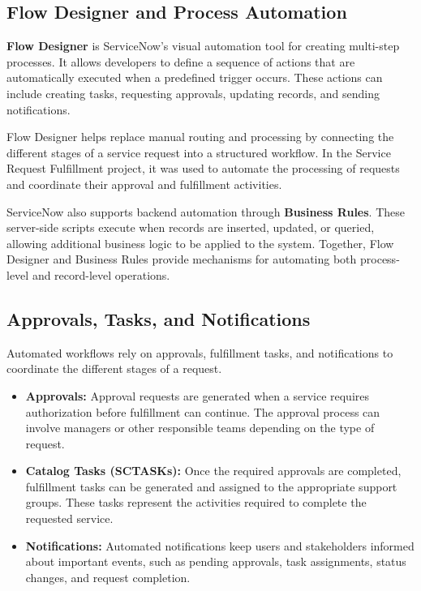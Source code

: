 \documentclass[12pt,a4paper]{report}
\begin{document}
\subsection{Flow Designer and Process Automation}

\textbf{Flow Designer} is ServiceNow's visual automation tool for creating
multi-step processes. It allows developers to define a sequence of actions
that are automatically executed when a predefined trigger occurs. These
actions can include creating tasks, requesting approvals, updating records,
and sending notifications.

Flow Designer helps replace manual routing and processing by connecting the
different stages of a service request into a structured workflow. In the
Service Request Fulfillment project, it was used to automate the processing
of requests and coordinate their approval and fulfillment activities.

ServiceNow also supports backend automation through \textbf{Business Rules}.
These server-side scripts execute when records are inserted, updated, or
queried, allowing additional business logic to be applied to the system.
Together, Flow Designer and Business Rules provide mechanisms for automating
both process-level and record-level operations.

\subsection{Approvals, Tasks, and Notifications}

Automated workflows rely on approvals, fulfillment tasks, and notifications
to coordinate the different stages of a request.

\begin{itemize}
    \item \textbf{Approvals:} Approval requests are generated when a service
    requires authorization before fulfillment can continue. The approval
    process can involve managers or other responsible teams depending on the
    type of request.

    \item \textbf{Catalog Tasks (SCTASKs):} Once the required approvals are
    completed, fulfillment tasks can be generated and assigned to the
    appropriate support groups. These tasks represent the activities required
    to complete the requested service.

    \item \textbf{Notifications:} Automated notifications keep users and
    stakeholders informed about important events, such as pending approvals,
    task assignments, status changes, and request completion.
\end{itemize}
\end{document}
